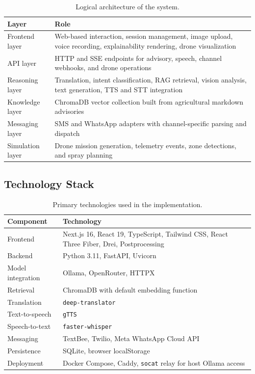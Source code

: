 \documentclass[11pt,a4paper]{article}
\begin{document}
\begin{table}[H]
\centering
\begin{tabularx}{\textwidth}{>{\raggedright\arraybackslash}p{} X}
\toprule
\textbf{Layer} & \textbf{Role} \\
\midrule
Frontend layer & Web-based interaction, session management, image upload, voice recording, explainability rendering, drone visualization \\
API layer & HTTP and SSE endpoints for advisory, speech, channel webhooks, and drone operations \\
Reasoning layer & Translation, intent classification, RAG retrieval, vision analysis, text generation, TTS and STT integration \\
Knowledge layer & ChromaDB vector collection built from agricultural markdown advisories \\
Messaging layer & SMS and WhatsApp adapters with channel-specific parsing and dispatch \\
Simulation layer & Drone mission generation, telemetry events, zone detections, and spray planning \\
\bottomrule
\end{tabularx}
\caption{Logical architecture of the system.}
\end{table}

\subsection{Technology Stack}

\begin{table}[H]
\centering
\begin{tabularx}{\textwidth}{>{\raggedright\arraybackslash}p{} X}
\toprule
\textbf{Component} & \textbf{Technology} \\
\midrule
Frontend & Next.js 16, React 19, TypeScript, Tailwind CSS, React Three Fiber, Drei, Postprocessing \\
Backend & Python 3.11, FastAPI, Uvicorn \\
Model integration & Ollama, OpenRouter, HTTPX \\
Retrieval & ChromaDB with default embedding function \\
Translation & \texttt{deep-translator} \\
Text-to-speech & \texttt{gTTS} \\
Speech-to-text & \texttt{faster-whisper} \\
Messaging & TextBee, Twilio, Meta WhatsApp Cloud API \\
Persistence & SQLite, browser localStorage \\
Deployment & Docker Compose, Caddy, \texttt{socat} relay for host Ollama access \\
\bottomrule
\end{tabularx}
\caption{Primary technologies used in the implementation.}
\end{table}
\end{document}
